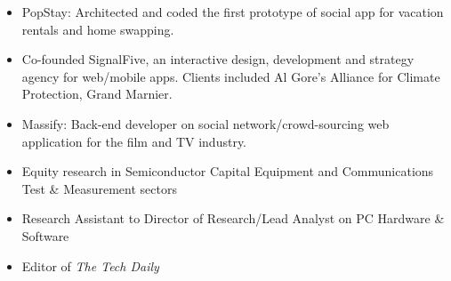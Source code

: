 \documentclass[a4paper,10pt]{memoir} %
\begin{document}
\begin{itemize}
	\item PopStay: Architected and coded the first prototype of social app for vacation rentals and home swapping.
	\item Co-founded SignalFive, an interactive design, development and strategy agency for web/mobile apps. Clients included Al Gore's Alliance for Climate Protection, Grand Marnier. 
	\item Massify: Back-end developer on social network/crowd-sourcing web application for the film and TV industry.
\end{itemize}
\Sep %

\clearpage %
\userinformation %
\framebreak %



\begin{itemize}
	\item Equity research in Semiconductor Capital Equipment and Communications Test \& Measurement sectors
\end{itemize}
\Sep %

\begin{itemize}
	\item Research Assistant to Director of Research/Lead Analyst on PC Hardware \& Software 
	\item Editor of \textit{The Tech Daily}
\end{itemize}

\Sep %



\end{document}
